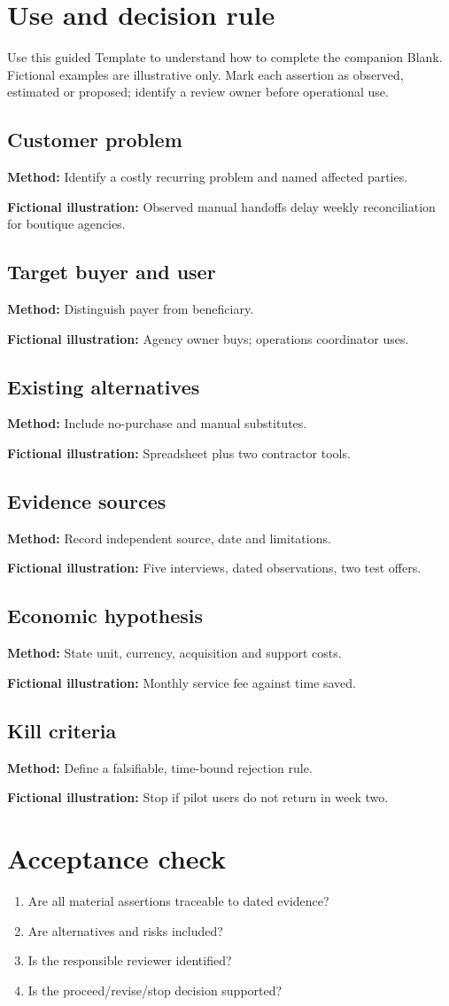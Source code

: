 \documentclass[11pt]{article}
\begin{document}
\SuiteOpen
\section{Use and decision rule}
Use this guided Template to understand how to complete the companion Blank. Fictional examples are illustrative only. Mark each assertion as observed, estimated or proposed; identify a review owner before operational use.
\subsection*{Customer problem}
\textbf{Method:} Identify a costly recurring problem and named affected parties.\par\textbf{Fictional illustration:} Observed manual handoffs delay weekly reconciliation for boutique agencies.\par
\subsection*{Target buyer and user}
\textbf{Method:} Distinguish payer from beneficiary.\par\textbf{Fictional illustration:} Agency owner buys; operations coordinator uses.\par
\subsection*{Existing alternatives}
\textbf{Method:} Include no-purchase and manual substitutes.\par\textbf{Fictional illustration:} Spreadsheet plus two contractor tools.\par
\subsection*{Evidence sources}
\textbf{Method:} Record independent source, date and limitations.\par\textbf{Fictional illustration:} Five interviews, dated observations, two test offers.\par
\subsection*{Economic hypothesis}
\textbf{Method:} State unit, currency, acquisition and support costs.\par\textbf{Fictional illustration:} Monthly service fee against time saved.\par
\subsection*{Kill criteria}
\textbf{Method:} Define a falsifiable, time-bound rejection rule.\par\textbf{Fictional illustration:} Stop if pilot users do not return in week two.\par
\section{Acceptance check}
\begin{enumerate}[leftmargin=*,itemsep=5pt]
\item Are all material assertions traceable to dated evidence?
\item Are alternatives and risks included?
\item Is the responsible reviewer identified?
\item Is the proceed/revise/stop decision supported?
\end{enumerate}
\end{document}
